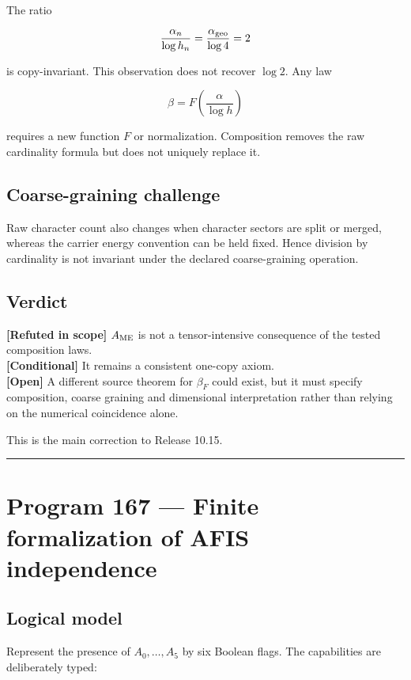 \documentclass[11pt,a4paper,openany]{report}
\newcommand{\statusConditional}{\textcolor{finorange}{[Conditional]}}
\newcommand{\statusRefuted}{\textcolor{finred}{[Refuted in scope]}}
\newcommand{\statusOpen}{\textcolor{finviolet}{[Open]}}
\begin{document}
The ratio

\[
\frac{\alpha_n}{\log h_n}
=\frac{\alpha_{\rm geo}}{\log4}=2
\]

is copy-invariant. This observation does not recover \(\log2\). Any law

\[
\beta=F\!\left(\frac{\alpha}{\log h}\right)
\]

requires a new function \(F\) or normalization. Composition removes the raw cardinality formula but does not uniquely replace it.

\section{Coarse-graining challenge}

Raw character count also changes when character sectors are split or merged, whereas the carrier energy convention can be held fixed. Hence division by cardinality is not invariant under the declared coarse-graining operation.

\section{Verdict}

\textbf{\statusRefuted{}} \(A_{\rm ME}\) is not a tensor-intensive consequence of the tested composition laws.\\
\textbf{\statusConditional{}} It remains a consistent one-copy axiom.\\
\textbf{\statusOpen{}} A different source theorem for \(\beta_F\) could exist, but it must specify composition, coarse graining and dimensional interpretation rather than relying on the numerical coincidence alone.

This is the main correction to Release 10.15.

\par\medskip\hrule\medskip

\chapter{Program 167 --- Finite formalization of AFIS independence}

\section{Logical model}

Represent the presence of \(A_0,\ldots,A_5\) by six Boolean flags. The capabilities are deliberately typed:
\end{document}
